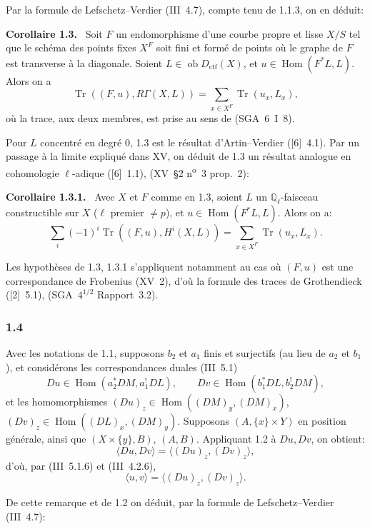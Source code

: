 \documentclass[11pt]{article}
\newenvironment{statement}[1]{\par\medskip\noindent\textbf{#1.}\ }{\par\medskip}
\DeclareMathOperator{\Hom}{Hom}
\newcommand{\ob}{\operatorname{ob}}
\providecommand{\ctf}{\mathrm{ctf}}
\providecommand{\Tr}{\operatorname{Tr}}
\providecommand{\Tr}{\operatorname{Tr}}
\providecommand{\Tr}{\operatorname{Tr}}
\providecommand{\Hom}{\operatorname{Hom}}
\providecommand{\ob}{\operatorname{ob}}
\providecommand{\Tr}{\operatorname{Tr}}
\begin{document}
Par la formule de Lefschetz--Verdier (III~4.7), compte tenu de 1.1.3, on en déduit:

\begin{statement}{Corollaire 1.3}
Soit $F$ un endomorphisme d'une courbe propre et lisse $X/S$ tel que le schéma des points fixes $X^F$ soit fini et formé de points où le graphe de $F$ est transverse à la diagonale. Soient $L\in\ob D_{\ctf}(X)$, et $u\in\Hom(F^*L,L)$. Alors on a
\[
\Tr((F,u),R\Gamma(X,L))=\sum_{x\in X^F}\Tr(u_x,L_x),
\]
où la trace, aux deux membres, est prise au sens de (SGA~6~I~8).
\end{statement}

Pour $L$ concentré en degré $0$, 1.3 est le résultat d'Artin--Verdier ([6]~4.1). Par un passage à la limite expliqué dans XV, on déduit de 1.3 un résultat analogue en cohomologie $\ell$-adique ([6]~1.1), (XV~\S2 n\textsuperscript{o}~3 prop.~2):

\begin{statement}{Corollaire 1.3.1}
Avec $X$ et $F$ comme en 1.3, soient $L$ un $\mathbb Q_\ell$-faisceau constructible sur $X$ ($\ell$ premier $\ne p$), et $u\in\Hom(F^*L,L)$. Alors on a:
\[
\sum_i(-1)^i\Tr((F,u),H^i(X,L))=\sum_{x\in X^F}\Tr(u_x,L_x).
\]
\end{statement}

Les hypothèses de 1.3, 1.3.1 s'appliquent notamment au cas où $(F,u)$ est une correspondance de Frobenius (XV~2), d'où la formule des traces de Grothendieck ([2]~5.1), (SGA~$4^{1/2}$ Rapport~3.2).

\subsubsection*{1.4}
Avec les notations de 1.1, supposons $b_2$ et $a_1$ finis et surjectifs (au lieu de $a_2$ et $b_1$), et considérons les correspondances duales (III~5.1)
\[
Du\in\Hom(a_2^*DM,a_1^!DL),\qquad Dv\in\Hom(b_1^*DL,b_2^!DM),
\]
et les homomorphismes $(Du)_z\in\Hom((DM)_y,(DM)_x)$, $(Dv)_z\in\Hom((DL)_x,(DM)_y)$. Supposons $(A,\{x\}\times Y)$ en position générale, ainsi que $(X\times\{y\},B)$, $(A,B)$. Appliquant 1.2 à $Du,Dv$, on obtient:
\[
\langle Du,Dv\rangle=\langle (Du)_z,(Dv)_z\rangle,
\]
d'où, par (III~5.1.6) et (III~4.2.6),
\begin{equation}\tag{1.4.1}
\langle u,v\rangle=\langle (Du)_z,(Dv)_z\rangle.
\end{equation}

De cette remarque et de 1.2 on déduit, par la formule de Lefschetz--Verdier (III~4.7):
\end{document}
